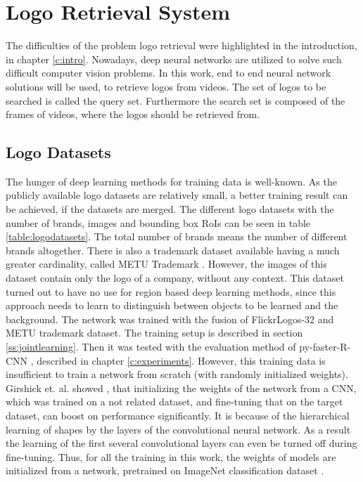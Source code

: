 \chapter{Logo Retrieval System}

The difficulties of the problem logo retrieval were highlighted in the introduction, in chapter \ref{c:intro}. Nowadays, deep neural networks are utilized to solve such difficult computer vision problems. In this work, end to end neural network solutions will be used, to retrieve logos from videos. The set of logos to be searched is called the query set. Furthermore the search set is composed of the frames of videos, where the logos should be retrieved from.
\bigbreak
\section{Logo Datasets}\label{s:logodatasets}
The hunger of deep learning methods for training data is well-known. As the publicly available logo datasets are relatively small, a better training result can be achieved, if the datasets are merged. The different logo datasets with the number of brands, images and bounding box RoIs can be seen in table \ref{table:logodatasets}. The total number of brands means the number of different brands altogether.
\bigbreak
There is also a trademark dataset available having a much greater cardinality, called METU Trademark \cite{DBLP:journals/corr/TursunAK17}. However, the images of this dataset contain only the logo of a company, without any context. This dataset turned out to have no use for region based deep learning methods, since this approach needs to learn to distinguish between objects to be learned and the background. The network was trained with the fusion of FlickrLogos-32 and METU trademark dataset. The training setup is described in section \ref{ss:jointlearning}. Then it was tested with the evaluation method of py-faster-R-CNN \cite{Girshick2017} \cite{NIPS2015_5638}, described in chapter \ref{c:experiments}.
\bigbreak
However, this training data is insufficient to train a network from scratch (with randomly initialized weights). Girshick et. al. showed \cite{DBLP:journals/corr/GirshickDDM13}, that initializing the weights of the network from a CNN, which was trained on a not related dataset, and fine-tuning that on the target dataset, can boost on performance significantly. It is because of the hierarchical learning of shapes by the layers of the convolutional neural network. As a result the learning of the first several convolutional layers can even be turned off during fine-tuning. Thus, for all the training in this work, the weights of models are initialized from a network, pretrained on ImageNet classification dataset \cite{imagenet_cvpr09}.
